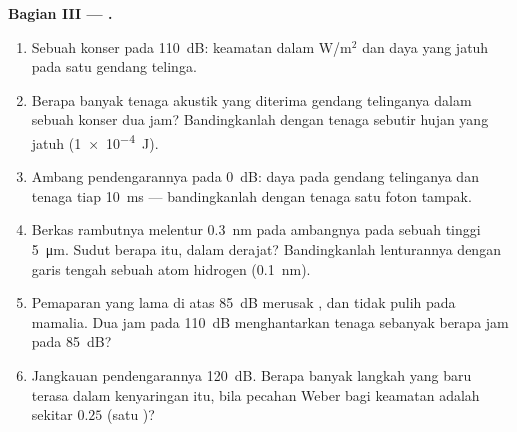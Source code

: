 \begin{problem}
\medskip
\noindent\textbf{Bagian III --- .}
\begin{enumerate}[resume]
  \item Sebuah konser pada \qty{110}{dB}: keamatan dalam W/m$^{2}$ dan daya
        yang jatuh pada satu gendang telinga.
  \item Berapa banyak tenaga akustik yang diterima gendang telinganya dalam sebuah konser
        dua jam? Bandingkanlah dengan tenaga sebutir hujan yang jatuh
        (\qty{1e-4}{J}).
  \item Ambang pendengarannya pada \qty{0}{dB}: daya pada gendang telinganya
        dan tenaga tiap \qty{10}{ms} --- bandingkanlah dengan tenaga satu
        foton tampak.
  \item Berkas rambutnya melentur \qty{0.3}{nm} pada ambangnya pada sebuah tinggi
        \qty{5}{\micro m}. Sudut berapa itu, dalam derajat? Bandingkanlah
        lenturannya dengan garis tengah sebuah atom hidrogen
        (\qty{0.1}{nm}).
  \item Pemaparan yang lama di atas \qty{85}{dB} merusak , dan
         tidak pulih pada mamalia. Dua jam pada
        \qty{110}{dB} menghantarkan tenaga sebanyak berapa jam pada
        \qty{85}{dB}?
  \item Jangkauan pendengarannya \qty{120}{dB}. Berapa banyak langkah yang baru
        terasa dalam kenyaringan itu, bila pecahan Weber bagi keamatan adalah
        sekitar $0.25$ (satu )?
\end{enumerate}


\end{problem}
